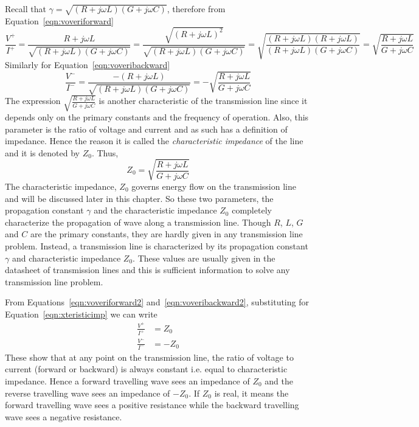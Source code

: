 Recall that $\gamma = \sqrt{(R + j\omega L)(G + j\omega C)}$, therefore from Equation~\eqref{eqn:voveriforward}
\begin{dmath}
\frac{V^+}{I^+} = \frac{R+j\omega L}{\sqrt{(R + j\omega L)(G + j\omega C)}}
= \frac{\sqrt{(R+j\omega L)^2}}{\sqrt{(R + j\omega L)(G + j\omega C)}}
=\sqrt{\frac{(R+j\omega L)(R+j\omega L)}{(R + j\omega L)(G + j\omega C)}}
=\sqrt{\frac{R+j\omega L}{G+j\omega C}}
\label{eqn:voveriforward2}
\end{dmath}
Similarly for Equation~\eqref{eqn:voveribackward}
\begin{dmath}
\frac{V^-}{I^-} = \frac{-(R+j\omega L)}{\sqrt{(R + j\omega L)(G + j\omega C)}}
=-\sqrt{\frac{R+j\omega L}{G+j\omega C}}
\label{eqn:voveribackward2}
\end{dmath}
The expression $\sqrt{\frac{R+j\omega L}{G+j\omega C}}$ is another characteristic of the transmission line since it depends only on the primary constants and the frequency of operation. Also, this parameter is the ratio of voltage and current and as such has a definition of impedance. Hence the reason it is called the \emph{characteristic impedance} of the line and it is denoted by $Z_0$. Thus,
\begin{equation}
Z_0 = \sqrt{\frac{R+j\omega L}{G+j\omega C}}
\label{eqn:xteristicimp}
\end{equation}
The characteristic impedance, $Z_0$ governs energy flow on the transmission line and will be discussed later in this chapter. So these two parameters, the propagation constant $\gamma$ and the characteristic impedance $Z_0$ completely characterize the propagation of wave along a transmission line. Though $R$, $L$, $G$ and $C$ are the primary constants, they are hardly given in any transmission line problem. Instead, a transmission line is characterized by its propagation constant $\gamma$ and characteristic impedance $Z_0$. These values are usually given in the datasheet of transmission lines and this is sufficient information to solve any transmission line problem.

From Equations~\eqref{eqn:voveriforward2} and~\eqref{eqn:voveribackward2}, substituting for Equation~\eqref{eqn:xteristicimp} we can write
\begin{align}
\frac{V^+}{I^+} &= Z_0\\
\frac{V^-}{I^-} &= -Z_0
\end{align}
These show that at any point on the transmission line, the ratio of voltage to current (forward or backward) is always constant i.e. equal to characteristic impedance. Hence a forward travelling wave sees an impedance of $Z_0$ and the reverse travelling wave sees an impedance of $-Z_0$. If $Z_0$ is real, it means the forward travelling wave sees a positive resistance while the backward travelling wave sees a negative resistance.

